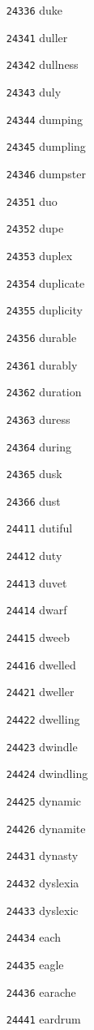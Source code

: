 \documentclass[twoside,11pt]{article}
\begin{document}
\begin{multicols}{5}
\begin{enumerate}
\item[\texttt{24336}] duke
\item[\texttt{24341}] duller
\item[\texttt{24342}] dullness
\item[\texttt{24343}] duly
\item[\texttt{24344}] dumping
\item[\texttt{24345}] dumpling
\item[\texttt{24346}] dumpster
\item[\texttt{24351}] duo
\item[\texttt{24352}] dupe
\item[\texttt{24353}] duplex
\item[\texttt{24354}] duplicate
\item[\texttt{24355}] duplicity
\item[\texttt{24356}] durable
\item[\texttt{24361}] durably
\item[\texttt{24362}] duration
\item[\texttt{24363}] duress
\item[\texttt{24364}] during
\item[\texttt{24365}] dusk
\item[\texttt{24366}] dust
\item[\texttt{24411}] dutiful
\item[\texttt{24412}] duty
\item[\texttt{24413}] duvet
\item[\texttt{24414}] dwarf
\item[\texttt{24415}] dweeb
\item[\texttt{24416}] dwelled
\item[\texttt{24421}] dweller
\item[\texttt{24422}] dwelling
\item[\texttt{24423}] dwindle
\item[\texttt{24424}] dwindling
\item[\texttt{24425}] dynamic
\item[\texttt{24426}] dynamite
\item[\texttt{24431}] dynasty
\item[\texttt{24432}] dyslexia
\item[\texttt{24433}] dyslexic
\item[\texttt{24434}] each
\item[\texttt{24435}] eagle
\item[\texttt{24436}] earache
\item[\texttt{24441}] eardrum

\end{enumerate}
\end{multicols}
\end{document}
